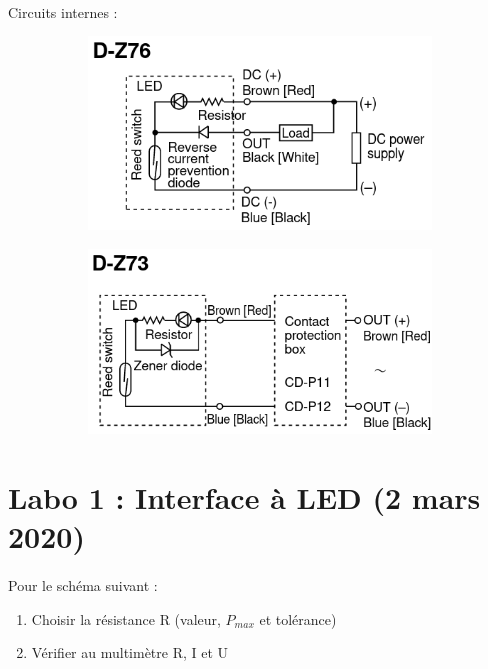 \documentclass{article}
\begin{document}
\paragraph{}
Circuits internes :
\begin{figure}[H]
    \centering
    \begin{subfigure}{.4\textwidth}
        \centering
        \includegraphics[width=\linewidth]{./images/D-Z76-schema.png}
    \end{subfigure}
    \begin{subfigure}{.4\textwidth}
        \centering
        \includegraphics[width=\linewidth]{./images/D-Z73-schema.png}
    \end{subfigure}
\end{figure}


\newpage
\section{Labo 1 : Interface à LED (2 mars 2020)}
\paragraph{}
Pour le schéma suivant :
\begin{enumerate}
    \item Choisir la résistance R (valeur, $P_{max}$ et tolérance)
    \item Vérifier au multimètre R, I et U
\end{enumerate}
\end{document}
